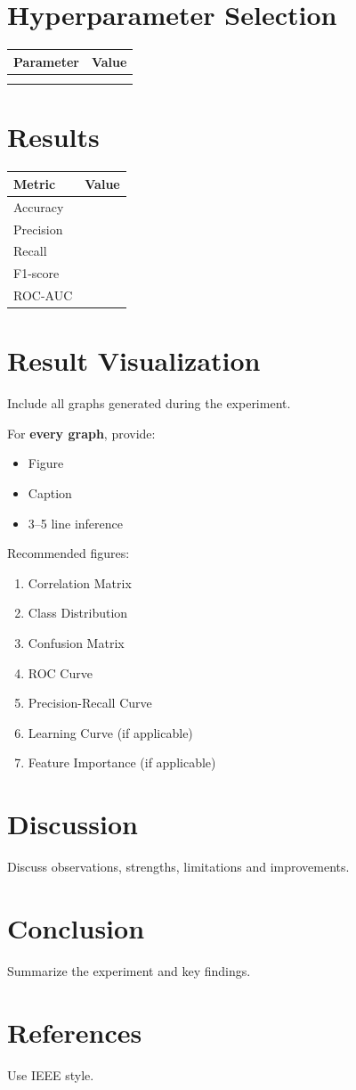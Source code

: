 \documentclass[12pt,a4paper]{article}
\begin{document}
\section{Hyperparameter Selection}

\begin{tabular}{ll}
\toprule
Parameter & Value\\
\midrule
 & \\
 & \\
\bottomrule
\end{tabular}



\section{Results}

\begin{tabular}{lc}
\toprule
Metric & Value\\
\midrule
Accuracy & \\
Precision & \\
Recall & \\
F1-score & \\
ROC-AUC & \\
\bottomrule
\end{tabular}

\section{Result Visualization}

Include all graphs generated during the experiment.

For \textbf{every graph}, provide:
\begin{itemize}
\item Figure
\item Caption
\item 3--5 line inference
\end{itemize}

Recommended figures:
\begin{enumerate}
\item Correlation Matrix
\item Class Distribution
\item Confusion Matrix
\item ROC Curve
\item Precision-Recall Curve
\item Learning Curve (if applicable)
\item Feature Importance (if applicable)
\end{enumerate}

\section{Discussion}
Discuss observations, strengths, limitations and improvements.

\section{Conclusion}
Summarize the experiment and key findings.

\section{References}
Use IEEE style.
\end{document}
